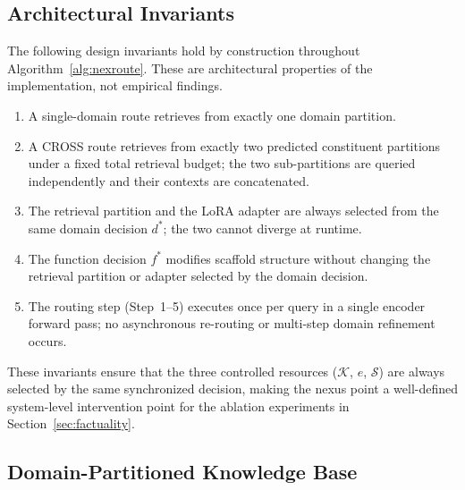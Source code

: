 \documentclass[a4paper,fleql,doubleblind]{cas-sc}
\begin{document}
\subsection{Architectural Invariants}
\label{ssec:invariants}

The following design invariants hold by construction throughout Algorithm~\ref{alg:nexroute}.
These are architectural properties of the implementation, not empirical findings.

\begin{enumerate}
\item A single-domain route retrieves from exactly one domain partition.
\item A CROSS route retrieves from exactly two predicted constituent partitions under
      a fixed total retrieval budget; the two sub-partitions are queried independently
      and their contexts are concatenated.
\item The retrieval partition and the LoRA adapter are always selected from the same
      domain decision $d^*$; the two cannot diverge at runtime.
\item The function decision $f^*$ modifies scaffold structure without changing
      the retrieval partition or adapter selected by the domain decision.
\item The routing step (Step~1--5) executes once per query in a single encoder
      forward pass; no asynchronous re-routing or multi-step domain refinement occurs.
\end{enumerate}

These invariants ensure that the three controlled resources ($\mathcal{K}$, $e$, $\mathcal{S}$)
are always selected by the same synchronized decision, making the nexus point a well-defined
system-level intervention point for the ablation experiments in Section~\ref{sec:factuality}.

\subsection{Domain-Partitioned Knowledge Base}
\label{ssec:retrieval}
\end{document}
